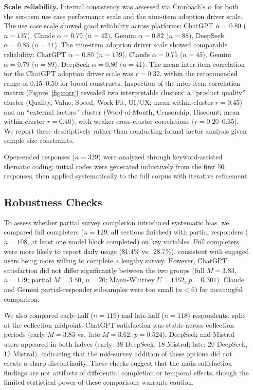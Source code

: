 \documentclass[10pt,twocolumn]{article}
\begin{document}
\textbf{Scale reliability.} Internal consistency was assessed via Cronbach's $\alpha$ for both the six-item use case performance scale and the nine-item adoption driver scale. The use case scale showed good reliability across platforms: ChatGPT $\alpha=0.80$ ($n=137$), Claude $\alpha=0.79$ ($n=42$), Gemini $\alpha=0.82$ ($n=88$), DeepSeek $\alpha=0.85$ ($n=41$). The nine-item adoption driver scale showed comparable reliability: ChatGPT $\alpha=0.80$ ($n=139$), Claude $\alpha=0.75$ ($n=45$), Gemini $\alpha=0.79$ ($n=89$), DeepSeek $\alpha=0.80$ ($n=41$). The mean inter-item correlation for the ChatGPT adoption driver scale was $r=0.32$, within the recommended range of 0.15--0.50 for broad constructs. Inspection of the inter-item correlation matrix (Figure~\ref{fig:corr}) revealed two interpretable clusters: a ``product quality'' cluster (Quality, Value, Speed, Work Fit, UI/UX; mean within-cluster $r=0.45$) and an ``external factors'' cluster (Word-of-Mouth, Censorship, Discount; mean within-cluster $r=0.40$), with weaker cross-cluster correlations ($r=0.20$--$0.35$). We report these descriptively rather than conducting formal factor analysis given sample size constraints.

Open-ended responses ($n=329$) were analyzed through keyword-assisted thematic coding: initial codes were generated inductively from the first 50 responses, then applied systematically to the full corpus with iterative refinement.


\subsection{Robustness Checks}

To assess whether partial survey completion introduced systematic bias, we compared full completers ($n=129$, all sections finished) with partial responders ($n=108$, at least one model block completed) on key variables. Full completers were more likely to report daily usage (81.4\% vs.\ 28.7\%), consistent with engaged users being more willing to complete a lengthy survey. However, ChatGPT satisfaction did not differ significantly between the two groups (full $M=3.83$, $n=119$; partial $M=3.50$, $n=20$; Mann-Whitney $U=1352$, $p=0.301$). Claude and Gemini partial-responder subsamples were too small ($n<6$) for meaningful comparison.

We also compared early-half ($n=119$) and late-half ($n=118$) respondents, split at the collection midpoint. ChatGPT satisfaction was stable across collection periods (early $M=3.83$ vs.\ late $M=3.62$, $p=0.524$). DeepSeek and Mistral users appeared in both halves (early: 38 DeepSeek, 18 Mistral; late: 20 DeepSeek, 12 Mistral), indicating that the mid-survey addition of these options did not create a sharp discontinuity. These checks suggest that the main satisfaction findings are not artifacts of differential completion or temporal effects, though the limited statistical power of these comparisons warrants caution.
\end{document}
